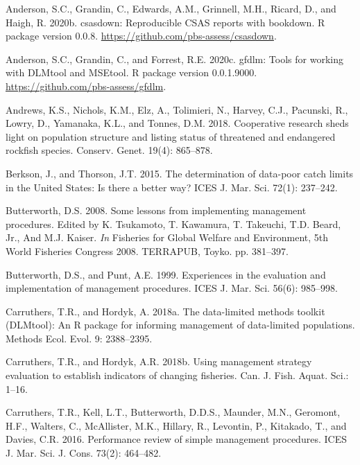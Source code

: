 \documentclass[11pt]{book}
\begin{document}
\leavevmode\hypertarget{ref-csasdown}{}%
Anderson, S.C., Grandin, C., Edwards, A.M., Grinnell, M.H., Ricard, D., and Haigh, R. 2020b. csasdown: Reproducible CSAS reports with bookdown. R package version 0.0.8. \url{https://github.com/pbs-assess/csasdown}.

\leavevmode\hypertarget{ref-gfdlm}{}%
Anderson, S.C., Grandin, C., and Forrest, R.E. 2020c. gfdlm: Tools for working with DLMtool and MSEtool. R package version 0.0.1.9000. \url{https://github.com/pbs-assess/gfdlm}.

\leavevmode\hypertarget{ref-andrews2018}{}%
Andrews, K.S., Nichols, K.M., Elz, A., Tolimieri, N., Harvey, C.J., Pacunski, R., Lowry, D., Yamanaka, K.L., and Tonnes, D.M. 2018. Cooperative research sheds light on population structure and listing status of threatened and endangered rockfish species. Conserv. Genet. 19(4): 865--878.

\leavevmode\hypertarget{ref-berkson2015}{}%
Berkson, J., and Thorson, J.T. 2015. The determination of data-poor catch limits in the United States: Is there a better way? ICES J. Mar. Sci. 72(1): 237--242.

\leavevmode\hypertarget{ref-butterworth2008}{}%
Butterworth, D.S. 2008. Some lessons from implementing management procedures. Edited by K. Tsukamoto, T. Kawamura, T. Takeuchi, T.D. Beard, Jr., And M.J. Kaiser. \emph{In} Fisheries for Global Welfare and Environment, 5th World Fisheries Congress 2008. TERRAPUB, Toyko. pp. 381--397.

\leavevmode\hypertarget{ref-butterworth1999}{}%
Butterworth, D.S., and Punt, A.E. 1999. Experiences in the evaluation and implementation of management procedures. ICES J. Mar. Sci. 56(6): 985--998.

\leavevmode\hypertarget{ref-carruthers2018}{}%
Carruthers, T.R., and Hordyk, A. 2018a. The data-limited methods toolkit (DLMtool): An R package for informing management of data-limited populations. Methods Ecol. Evol. 9: 2388--2395.

\leavevmode\hypertarget{ref-carruthers_hordyk_2018}{}%
Carruthers, T.R., and Hordyk, A.R. 2018b. Using management strategy evaluation to establish indicators of changing fisheries. Can. J. Fish. Aquat. Sci.: 1--16.

\leavevmode\hypertarget{ref-carruthers2016}{}%
Carruthers, T.R., Kell, L.T., Butterworth, D.D.S., Maunder, M.N., Geromont, H.F., Walters, C., McAllister, M.K., Hillary, R., Levontin, P., Kitakado, T., and Davies, C.R. 2016. Performance review of simple management procedures. ICES J. Mar. Sci. J. Cons. 73(2): 464--482.
\end{document}
